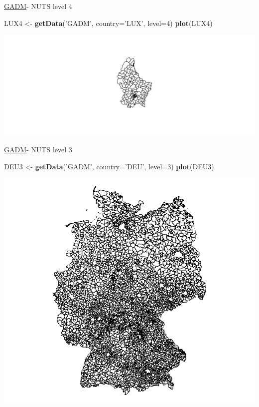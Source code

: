 \documentclass[ignorenonframetext,]{beamer}
\newenvironment{Shaded}{\begin{snugshade}}{\end{snugshade}}
\newcommand{\KeywordTok}[1]{\textcolor[rgb]{0.13,0.29,0.53}{\textbf{#1}}}
\newcommand{\DataTypeTok}[1]{\textcolor[rgb]{0.13,0.29,0.53}{#1}}
\newcommand{\DecValTok}[1]{\textcolor[rgb]{0.00,0.00,0.81}{#1}}
\newcommand{\StringTok}[1]{\textcolor[rgb]{0.31,0.60,0.02}{#1}}
\newcommand{\NormalTok}[1]{#1}
\begin{document}
\begin{frame}[fragile]{\href{http://www.gadm.org/}{GADM}- NUTS level 4}

\begin{Shaded}
\begin{Highlighting}[]
\NormalTok{LUX4 <-}\StringTok{ }\KeywordTok{getData}\NormalTok{(}\StringTok{'GADM'}\NormalTok{, }\DataTypeTok{country=}\StringTok{'LUX'}\NormalTok{, }\DataTypeTok{level=}\DecValTok{4}\NormalTok{)}
\KeywordTok{plot}\NormalTok{(LUX4)}
\end{Highlighting}
\end{Shaded}

\includegraphics{Shapefiles_files/figure-beamer/LUX4-1.pdf}

\end{frame}

\begin{frame}[fragile]{\href{http://www.gadm.org/}{GADM}- NUTS level 3}

\begin{Shaded}
\begin{Highlighting}[]
\NormalTok{DEU3 <-}\StringTok{ }\KeywordTok{getData}\NormalTok{(}\StringTok{'GADM'}\NormalTok{, }\DataTypeTok{country=}\StringTok{'DEU'}\NormalTok{, }\DataTypeTok{level=}\DecValTok{3}\NormalTok{)}
\KeywordTok{plot}\NormalTok{(DEU3)}
\end{Highlighting}
\end{Shaded}

\includegraphics{figure/DEU3.png}

\end{frame}
\end{document}
